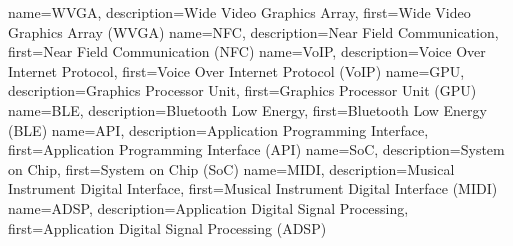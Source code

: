 {
  name={WVGA},
  description={Wide Video Graphics Array},
  first={Wide Video Graphics Array (WVGA)}
}
{
	name={NFC},
	description={Near Field Communication},
	first={Near Field Communication (NFC)}
}
{
	name={VoIP},
	description={Voice Over Internet Protocol},
	first={Voice Over Internet Protocol (VoIP)}
}
{
	name={GPU},
	description={Graphics Processor Unit},
	first={Graphics Processor Unit (GPU)}
}
{
	name={BLE},
	description={Bluetooth Low Energy},
	first={Bluetooth Low Energy (BLE)}
}
{
	name={API},
	description={Application Programming Interface},
	first={Application Programming Interface (API)}
}
{
	name={SoC},
	description={System on Chip},
	first={System on Chip (SoC)}
}
{
	name={MIDI},
	description={Musical Instrument Digital Interface},
	first={Musical Instrument Digital Interface (MIDI)}
}
{
	name={ADSP},
	description={Application Digital Signal Processing},
	first={Application Digital Signal Processing (ADSP)}
}

